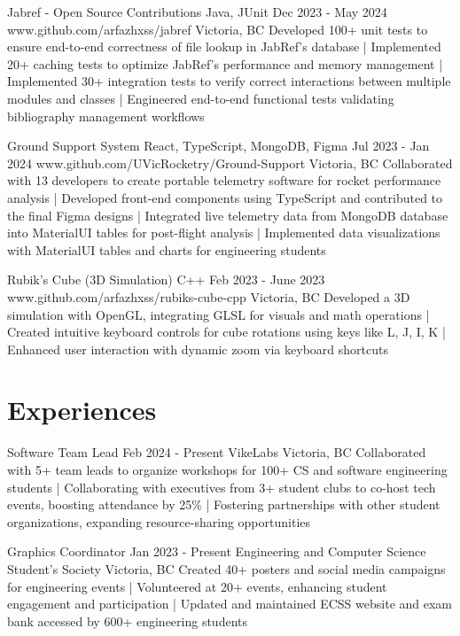 \documentclass[a4paper,10pt]{article}
\begin{document}
\projectentry
{Jabref - Open Source Contributions}
{Java, JUnit}
{Dec 2023 - May 2024}
{www.github.com/arfazhxss/jabref}
{Victoria, BC}
{Developed 100+ unit tests to ensure end-to-end correctness of file lookup in JabRef's database
| Implemented 20+ caching tests to optimize JabRef's performance and memory management
| Implemented 30+ integration tests to verify correct interactions between multiple modules and classes
| Engineered end-to-end functional tests validating bibliography management workflows
}

\projectentry
{Ground Support System}
{React, TypeScript, MongoDB, Figma}
{Jul 2023 - Jan 2024}
{www.github.com/UVicRocketry/Ground-Support}
{Victoria, BC}
{Collaborated with 13 developers to create portable telemetry software for rocket performance analysis 
| Developed front-end components using TypeScript and contributed to the final Figma designs
| Integrated live telemetry data from MongoDB database into MaterialUI tables for post-flight analysis
| Implemented data visualizations with MaterialUI tables and charts for engineering students 
}

\projectentry
{Rubik's Cube (3D Simulation)}
{C++}
{Feb 2023 - June 2023}
{www.github.com/arfazhxss/rubiks-cube-cpp}
{Victoria, BC}
{Developed a 3D simulation with OpenGL, integrating GLSL for visuals and math operations 
| Created intuitive keyboard controls for cube rotations using keys like L, J, I, K 
| Enhanced user interaction with dynamic zoom via keyboard shortcuts 
}

\section{Experiences}
\relevantexperience
{Software Team Lead}
{Feb 2024 - Present}
{VikeLabs}
{Victoria, BC}
{Collaborated with 5+ team leads to organize workshops for 100+ CS and software engineering students 
| Collaborating with executives from 3+ student clubs to co-host tech events, boosting attendance by 25\% 
| Fostering partnerships with other student organizations, expanding resource-sharing opportunities 
}

\relevantexperience
{Graphics Coordinator}
{Jan 2023 - Present}
{Engineering and Computer Science Student’s Society}
{Victoria, BC}
{Created 40+ posters and social media campaigns for engineering events 
| Volunteered at 20+ events, enhancing student engagement and participation 
| Updated and maintained ECSS website and exam bank accessed by 600+ engineering students
}
\end{document}
